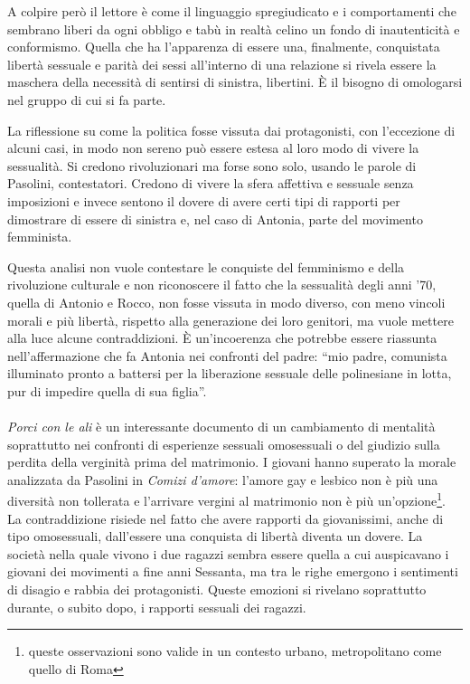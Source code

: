 A colpire però il lettore è come il linguaggio spregiudicato e i comportamenti che sembrano liberi da ogni obbligo e tabù in realtà celino un fondo di inautenticità e conformismo.
Quella che ha l'apparenza di essere una, finalmente, conquistata libertà sessuale e parità dei sessi all'interno di una relazione si rivela essere la maschera della necessità di sentirsi di sinistra, libertini.
È il bisogno di omologarsi nel gruppo di cui si fa parte.

La riflessione su come la politica fosse vissuta dai protagonisti, con l'eccezione di alcuni casi, in modo non sereno può essere estesa al loro modo di vivere la sessualità.
Si credono rivoluzionari ma forse sono solo, usando le parole di Pasolini, contestatori.
Credono di vivere la sfera affettiva e sessuale senza imposizioni e invece sentono il dovere di avere certi tipi di rapporti per dimostrare di essere di sinistra e, nel caso di Antonia, parte del movimento femminista.

Questa analisi non vuole contestare le conquiste del femminismo e della rivoluzione culturale e non riconoscere il fatto che la sessualità degli anni '70, quella di Antonio e Rocco, non fosse vissuta in modo diverso, con meno vincoli morali e più libertà, rispetto alla generazione dei loro genitori, ma vuole mettere alla luce alcune contraddizioni.
È un'incoerenza che potrebbe essere riassunta nell'affermazione che fa Antonia nei confronti del padre: \enquote{mio padre, comunista illuminato pronto a battersi per la liberazione sessuale delle polinesiane in lotta, pur di impedire quella di sua figlia}.

\paragraph{}\textit{Porci con le ali} è un interessante documento di un cambiamento di mentalità soprattutto nei confronti di esperienze sessuali omosessuali o del giudizio sulla perdita della verginità prima del matrimonio.
I giovani hanno superato la morale analizzata da Pasolini in \textit{Comizi d'amore}: l'amore gay e lesbico non è più una diversità non tollerata e l'arrivare vergini al matrimonio non è più un'opzione\footnote{queste osservazioni sono valide in un contesto urbano, metropolitano come quello di Roma}.
La contraddizione risiede nel fatto che avere rapporti da giovanissimi, anche di tipo omosessuali, dall'essere una conquista di libertà diventa un dovere.
La società nella quale vivono i due ragazzi sembra essere quella a cui auspicavano i giovani dei movimenti a fine anni Sessanta, ma tra le righe emergono i sentimenti di disagio e rabbia dei protagonisti.
Queste emozioni si rivelano soprattutto durante, o subito dopo, i rapporti sessuali dei ragazzi.

